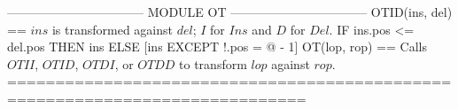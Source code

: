 \documentclass{article}
\begin{document}
\begin{tla}
--------------------------------- MODULE OT ---------------------------------
OTID(ins, del) == \* $ins$ is transformed against $del$; $I$ for $Ins$ and $D$ for $Del$.
    IF ins.pos <= del.pos THEN ins ELSE [ins EXCEPT !.pos = @ - 1]
OT(lop, rop) == \* Calls $OTII$, $OTID$, $OTDI$, or $OTDD$ to transform $lop$ against $rop$.
=============================================================================
\end{tla}
\end{document}

